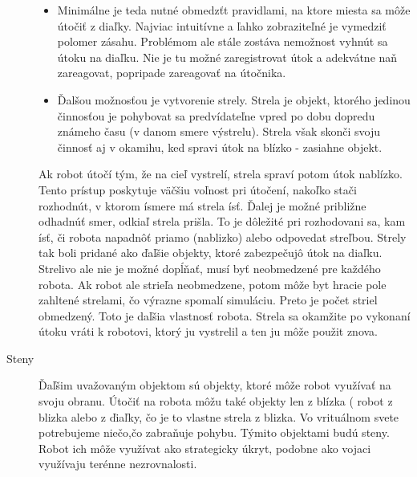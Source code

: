 \begin{description}
\begin{itemize}
\item Minimálne je teda nutné obmedzťt pravidlami, na ktore miesta sa môže útočiť z diaľky. Najviac intuitívne a ľahko zobraziteľné je vymedziť polomer zásahu. Problémom ale stále zostáva nemožnost vyhnút sa útoku na diaľku. Nie je tu možné zaregistrovat útok a adekvátne naň zareagovat, popripade zareagovať na útočnika.\\ %
\item Ďalšou možnosťou je vytvorenie strely. Strela je objekt, ktorého jedinou činnosťou je pohybovat sa predvídateľne vpred po dobu dopredu  známeho času  (v danom smere výstrelu). Strela však skonči svoju činnosť aj v okamihu, ked spravi útok na blízko - zasiahne objekt.
\end{itemize}
Ak robot útočí tým, že na cieľ vystrelí, strela spraví potom útok nablízko. Tento prístup poskytuje väčšiu voľnost pri útočení, nakoľko stači rozhodnút, v ktorom ísmere  má strela ísť. Ďalej je možné  približne odhadnúť smer, odkiaľ strela prišla.  To je dôležité pri rozhodovani sa, kam ísť, či robota napadnôť priamo (nablizko) alebo odpovedat streľbou. Strely tak boli pridané ako ďaľšie objekty, ktoré zabezpečujô útok na diaľku. Strelivo ale nie je možné dopĺňať, musí byť neobmedzené pre každého robota. Ak robot ale strieľa neobmedzene, potom môže byt hracie pole zahltené strelami, čo výrazne spomalí simuláciu. Preto je počet striel obmedzený. Toto je daľšia vlastnosť robota. Strela sa okamžite po vykonaní útoku vráti k robotovi, ktorý ju vystrelil a ten ju môže použit znova.%
\item[Steny] \hfill
Ďaľšim uvažovaným objektom sú objekty, ktoré môže robot využívať na  svoju obranu. Útočiť na robota môžu také objekty len z blízka ( robot z blizka alebo z ďiaľky, čo je to vlastne strela z blizka.  Vo vrituálnom  svete potrebujeme niečo,čo zabraňuje pohybu. Týmito objektami budú steny. Robot ich môže využívat ako strategicky úkryt,  podobne ako vojaci využívaju terénne nezrovnalosti. %

\end{description}
